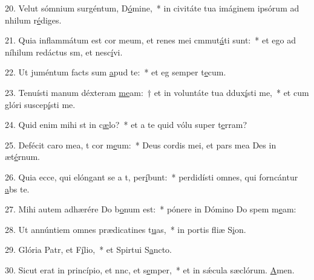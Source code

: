 20. Velut sómnium surgéntum, D\uline{ó}mine,~* in civitáte tua imáginem ipsórum ad nhilum r\uline{é}diges.\par 
21. Quia inflammátum est cor meum, et renes mei cmmut\uline{á}ti sunt:~* et ego ad níhilum redáctus sm, et nesc\uline{í}vi.\par 
22. Ut juméntum facts sum \uline{a}pud te:~* et eg semper t\uline{e}cum.\par 
23. Tenuísti manum déxteram \uline{me}am:~† et in voluntáte tua ddux\uline{í}sti me,~* et cum glóri suscep\uline{í}sti me.\par 
24. Quid enim mihi st in c\uline{æ}lo?~* et a te quid vólu super t\uline{e}rram?\par 
25. Defécit caro mea, t cor m\uline{e}um:~* Deus cordis mei, et pars mea Des in æt\uline{é}rnum.\par 
26. Quia ecce, qui elóngant se a t, per\uline{í}bunt:~* perdidísti omnes, qui forncántur \uline{a}bs te.\par 
27. Mihi autem adhærére Do b\uline{o}num est:~* pónere in Dómino Do spem m\uline{e}am:\par 
28. Ut annúntiem omnes prædicatines t\uline{u}as,~* in portis fliæ S\uline{i}on.\par 
29. Glória Patr, et F\uline{í}lio,~* et Spirtui S\uline{a}ncto.\par 
30. Sicut erat in princípio, et nnc, et s\uline{e}mper,~* et in sǽcula sæclórum. \uline{A}men.\par 
